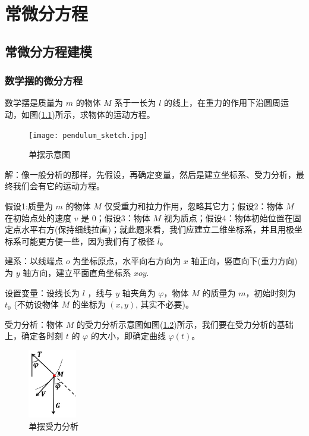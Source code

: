 % 
\chapter{常微分方程}\label{cha:ode}
\section{常微分方程建模}\label{sec:de-ode-modeling}
	\subsection{数学摆的微分方程}
		\label{sub:de-ode-modeling-pendulum}
		数学摆是质量为 $m$ 的物体 $M$ 系于一长为 $l$ 的线上，在重力的作用下沿圆周运动，如图(\ref{fig:单摆示意图})所示，求物体的运动方程。
		\par
		\begin{figure}[H]
		\centering
		\texttt{[image: pendulum\_sketch.jpg]}%
		\caption{单摆示意图}
		\label{fig:单摆示意图}
		\end{figure}
		解：像一般分析的那样，先假设，再确定变量，然后是建立坐标系、受力分析，最终我们会有它的运动方程。
		\par
		假设1:质量为 $m$ 的物体 $M$ 仅受重力和拉力作用，忽略其它力；假设2：物体 $M$ 在初始点处的速度 $v$ 是 0；假设3：物体 $M$ 视为质点；假设4：物体初始位置在固定点水平右方(保持细线拉直)；就此题来看，我们应建立二维坐标系，并且用极坐标系可能更方便一些，因为我们有了极径 $l$。
		\par
		建系：以线端点 $o$ 为坐标原点，水平向右方向为 $x$ 轴正向，竖直向下(重力方向)为 $y$ 轴方向，建立平面直角坐标系 $xoy$.
		\par
		设置变量：设线长为 $l$ ，线与 $y$ 轴夹角为 $\varphi$，物体 $M$ 的质量为 $m$，初始时刻为 $t_0$ (不妨设物体 $M$ 的坐标为 $(x,y)$, 其实不必要)。
		\par
		受力分析：物体 $M$ 的受力分析示意图如图(\ref{fig:单摆受力分析示意图})所示，我们要在受力分析的基础上，确定各时刻 $t$ 的 $\varphi$ 的大小，即确定曲线 $\varphi(t)$。
		 \begin{figure}[H]
		\centering
		\includegraphics[height=3cm]{images/pendulum_sketch_force_analysis.jpg}%
		\caption{单摆受力分析}
		\label{fig:单摆受力分析示意图}
		\end{figure}
